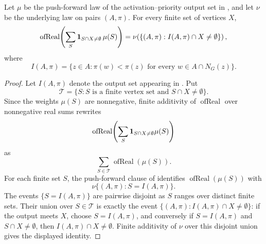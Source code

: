 \begin{helper}
Let $\mu$ be the push-forward law of the activation--priority output set in
, and let $\nu$ be the underlying law on
pairs $(A,\pi)$.  For every finite set of vertices $X$,
\[
\operatorname{ofReal}\!\left(\sum_S
  {\bf 1}_{S\cap X\ne\emptyset}\,\mu(S)\right)
=
\nu\!\left(\{(A,\pi):I(A,\pi)\cap X\ne\emptyset\}\right),
\]
where
\[
I(A,\pi)=\{z\in A:\pi(w)<\pi(z)\text{ for every }w\in A\cap N_G(z)\}.
\]
\end{helper}
\begin{proof}
Let \(I(A,\pi)\) denote the output set appearing in
.  Put
\[
\mathcal T=\{S:S\text{ is a finite vertex set and }S\cap X\ne\emptyset\}.
\]
Since the weights \(\mu(S)\) are nonnegative, finite additivity of
\(\operatorname{ofReal}\) over nonnegative real sums rewrites
\[
\operatorname{ofReal}\!\left(\sum_S
  {\bf 1}_{S\cap X\ne\emptyset}\mu(S)\right)
\]
as
\[
\sum_{S\in\mathcal T}\operatorname{ofReal}(\mu(S)).
\]
For each finite set \(S\), the push-forward clause of
 identifies
\(\operatorname{ofReal}(\mu(S))\) with
\[
\nu\{(A,\pi):S=I(A,\pi)\}.
\]
The events \(\{S=I(A,\pi)\}\) are pairwise disjoint as \(S\) ranges over
distinct finite sets.  Their union over \(S\in\mathcal T\) is exactly the
event \(\{(A,\pi):I(A,\pi)\cap X\ne\emptyset\}\): if the output meets \(X\),
choose \(S=I(A,\pi)\), and conversely if \(S=I(A,\pi)\) and \(S\cap X\ne
\emptyset\), then \(I(A,\pi)\cap X\ne\emptyset\).  Finite additivity of
\(\nu\) over this disjoint union gives the displayed identity.
\end{proof}
